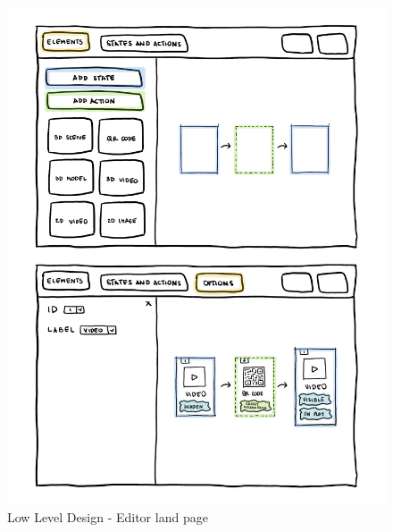 \begin{figure}[h]
    \centering
    \includegraphics[width=\textwidth]{Figures/Editor/wireframes/canva1.png}
    \caption{Low Level Design - Editor land page}
    \label{fig:canva1}
\end{figure}

